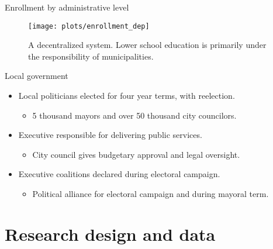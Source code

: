 \documentclass[ignorenonframetext,]{beamer}
\providecommand{\tightlist}{%
  \setlength{\itemsep}{0pt}\setlength{\parskip}{0pt}}
\begin{document}
\begin{frame}{Enrollment by administrative level}
\protect\hypertarget{enrollment-by-administrative-level}{}

\begin{figure}

{\centering \texttt{[image: plots/enrollment\_dep]} 

}

\caption{A decentralized system. Lower school education is primarily under the responsibility of municipalities.}\label{fig:unnamed-chunk-4}
\end{figure}

\end{frame}

\begin{frame}{Local government}
\protect\hypertarget{local-government}{}

\begin{itemize}
\tightlist
\item
  Local politicians elected for four year terms, with reelection.

  \begin{itemize}
  \tightlist
  \item
    5 thousand mayors and over 50 thousand city councilors.
  \end{itemize}
\item
  Executive responsible for delivering public services.

  \begin{itemize}
  \tightlist
  \item
    City council gives budgetary approval and legal oversight.
  \end{itemize}
\item
  Executive coalitions declared during electoral campaign.

  \begin{itemize}
  \tightlist
  \item
    Political alliance for electoral campaign and during mayoral term.
  \end{itemize}
\end{itemize}

\end{frame}

\hypertarget{research-design-and-data}{%
\section{Research design and data}\label{research-design-and-data}}
\end{document}
